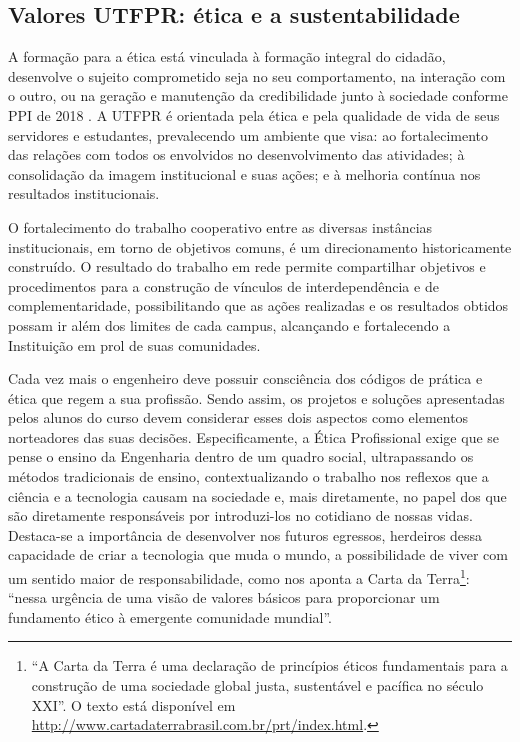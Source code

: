 
\subsection{Valores UTFPR: ética e a sustentabilidade}

A formação para a ética está vinculada à formação integral do cidadão, desenvolve o sujeito comprometido seja no seu comportamento, na interação com o outro, ou na geração e manutenção da credibilidade junto à sociedade conforme PPI de 2018 \cite{ppiutfpr}.  A UTFPR é orientada pela ética e pela qualidade de vida de seus servidores e estudantes, prevalecendo um ambiente que visa: ao fortalecimento das relações com todos os envolvidos no desenvolvimento das atividades; à consolidação da imagem institucional e suas ações; e à melhoria contínua nos resultados institucionais.

O fortalecimento do trabalho cooperativo entre as diversas instâncias institucionais, em torno de objetivos comuns, é um direcionamento historicamente construído. O resultado do trabalho em rede permite compartilhar objetivos e procedimentos para a construção de vínculos de interdependência e de complementaridade, possibilitando que as ações realizadas e os resultados obtidos possam ir além dos limites de cada campus, alcançando e fortalecendo a Instituição em prol de suas comunidades.

Cada vez mais o engenheiro deve possuir consciência dos códigos de prática e ética que regem a sua profissão. Sendo assim, os projetos e soluções apresentadas pelos alunos do curso devem considerar esses dois aspectos como elementos norteadores das suas decisões. Especificamente, a Ética Profissional exige que se pense o ensino da Engenharia dentro de um quadro social, ultrapassando os métodos tradicionais de ensino, contextualizando o trabalho nos reflexos que a ciência e a tecnologia causam na sociedade e, mais diretamente, no papel dos que são diretamente responsáveis por introduzi-los no cotidiano de nossas vidas.  Destaca-se a importância de desenvolver nos futuros egressos, herdeiros dessa capacidade de criar a tecnologia que muda o mundo, a possibilidade de viver com um sentido maior de responsabilidade, como nos aponta a Carta da Terra\footnote{``A Carta da Terra é uma declaração de princípios éticos fundamentais para a construção de uma sociedade global justa, sustentável e pacífica no século XXI''. O texto está disponível em \url{http://www.cartadaterrabrasil.com.br/prt/index.html}.}: ``nessa urgência de uma visão de valores básicos para proporcionar um fundamento ético à emergente comunidade mundial''.

